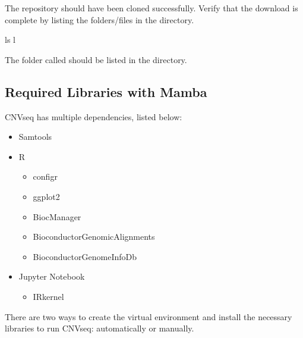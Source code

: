 \documentclass[letterpaper,10pt,english]{sphinxhowto}
\begin{document}
\sphinxAtStartPar
The  repository should have been cloned successfully. Verify that the download is complete by listing the folders/files in the directory.

\begin{sphinxVerbatim}[commandchars=\\\{\}]
\PYGZdl{} ls \PYGZhy{}l
\end{sphinxVerbatim}

\sphinxAtStartPar
The folder called  should be listed in the directory.


\subsection{Required Libraries with Mamba}
\label{\detokenize{index:required-libraries-with-mamba}}
\sphinxAtStartPar
CNVseq has multiple dependencies, listed below:
\begin{itemize}
\item {} 
\sphinxAtStartPar
Samtools

\item {} 
\sphinxAtStartPar
R
\begin{itemize}
\item {} 
\sphinxAtStartPar
configr

\item {} 
\sphinxAtStartPar
ggplot2

\item {} 
\sphinxAtStartPar
BiocManager

\item {} 
\sphinxAtStartPar
Bioconductor\sphinxhyphen{}GenomicAlignments

\item {} 
\sphinxAtStartPar
Bioconductor\sphinxhyphen{}GenomeInfoDb

\end{itemize}

\item {} 
\sphinxAtStartPar
Jupyter Notebook
\begin{itemize}
\item {} 
\sphinxAtStartPar
IRkernel

\end{itemize}

\end{itemize}

\sphinxAtStartPar
There are two ways to create the  virtual environment and install the necessary libraries to run CNVseq: automatically or manually.
\end{document}
